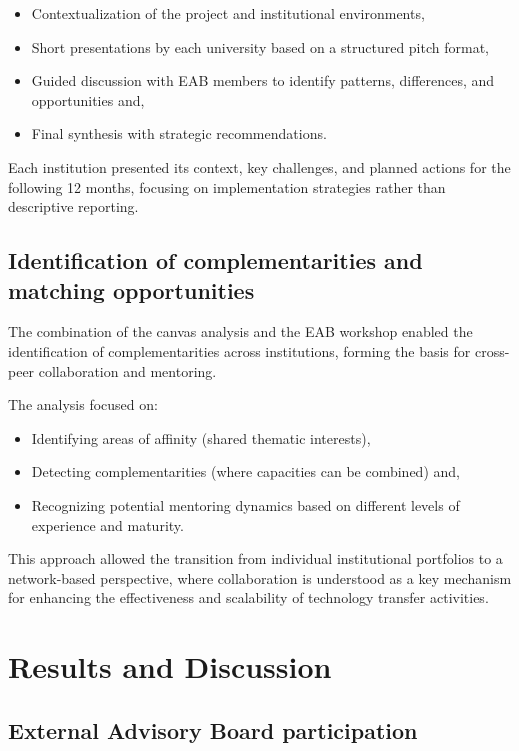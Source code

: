 \documentclass[
  12pt,
  oneside]{book}
\providecommand{\tightlist}{%
  \setlength{\itemsep}{0pt}\setlength{\parskip}{0pt}}
\begin{document}
\begin{itemize}
\tightlist
\item
  Contextualization of the project and institutional environments,
\item
  Short presentations by each university based on a structured pitch
  format,
\item
  Guided discussion with EAB members to identify patterns, differences,
  and opportunities and,
\item
  Final synthesis with strategic recommendations.
\end{itemize}

Each institution presented its context, key challenges, and planned
actions for the following 12 months, focusing on implementation
strategies rather than descriptive reporting.

\section{Identification of complementarities and matching
opportunities}\label{identification-of-complementarities-and-matching-opportunities}

The combination of the canvas analysis and the EAB workshop enabled the
identification of complementarities across institutions, forming the
basis for cross-peer collaboration and mentoring.

The analysis focused on:

\begin{itemize}
\tightlist
\item
  Identifying areas of affinity (shared thematic interests),
\item
  Detecting complementarities (where capacities can be combined) and,
\item
  Recognizing potential mentoring dynamics based on different levels of
  experience and maturity.
\end{itemize}

This approach allowed the transition from individual institutional
portfolios to a network-based perspective, where collaboration is
understood as a key mechanism for enhancing the effectiveness and
scalability of technology transfer activities.

\chapter{Results and Discussion}\label{results-and-discussion}

\section{External Advisory Board
participation}\label{external-advisory-board-participation}
\end{document}

